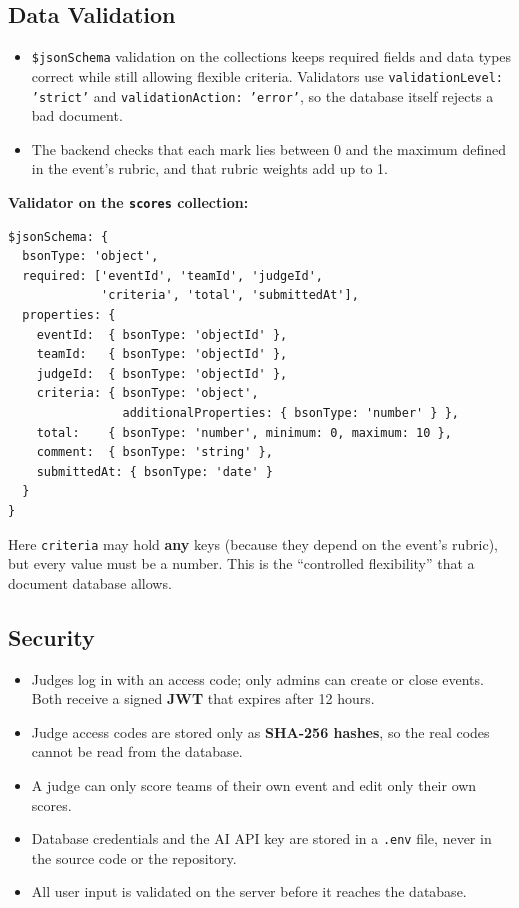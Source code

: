 \documentclass[11pt,a4paper]{article}
\begin{document}
\subsection{Data Validation}
\begin{itemize}
  \item \texttt{\$jsonSchema} validation on the collections keeps required fields and data types correct while still allowing flexible criteria. Validators use \texttt{validationLevel: 'strict'} and \texttt{validationAction: 'error'}, so the database itself rejects a bad document.
  \item The backend checks that each mark lies between 0 and the maximum defined in the event's rubric, and that rubric weights add up to 1.
\end{itemize}

\textbf{Validator on the \texttt{scores} collection:}
\begin{lstlisting}
$jsonSchema: {
  bsonType: 'object',
  required: ['eventId', 'teamId', 'judgeId',
             'criteria', 'total', 'submittedAt'],
  properties: {
    eventId:  { bsonType: 'objectId' },
    teamId:   { bsonType: 'objectId' },
    judgeId:  { bsonType: 'objectId' },
    criteria: { bsonType: 'object',
                additionalProperties: { bsonType: 'number' } },
    total:    { bsonType: 'number', minimum: 0, maximum: 10 },
    comment:  { bsonType: 'string' },
    submittedAt: { bsonType: 'date' }
  }
}
\end{lstlisting}
Here \texttt{criteria} may hold \textbf{any} keys (because they depend on the event's rubric), but every value must be a number. This is the ``controlled flexibility'' that a document database allows.

\subsection{Security}
\begin{itemize}
  \item Judges log in with an access code; only admins can create or close events. Both receive a signed \textbf{JWT} that expires after 12 hours.
  \item Judge access codes are stored only as \textbf{SHA-256 hashes}, so the real codes cannot be read from the database.
  \item A judge can only score teams of their own event and edit only their own scores.
  \item Database credentials and the AI API key are stored in a \texttt{.env} file, never in the source code or the repository.
  \item All user input is validated on the server before it reaches the database.
\end{itemize}
\end{document}

